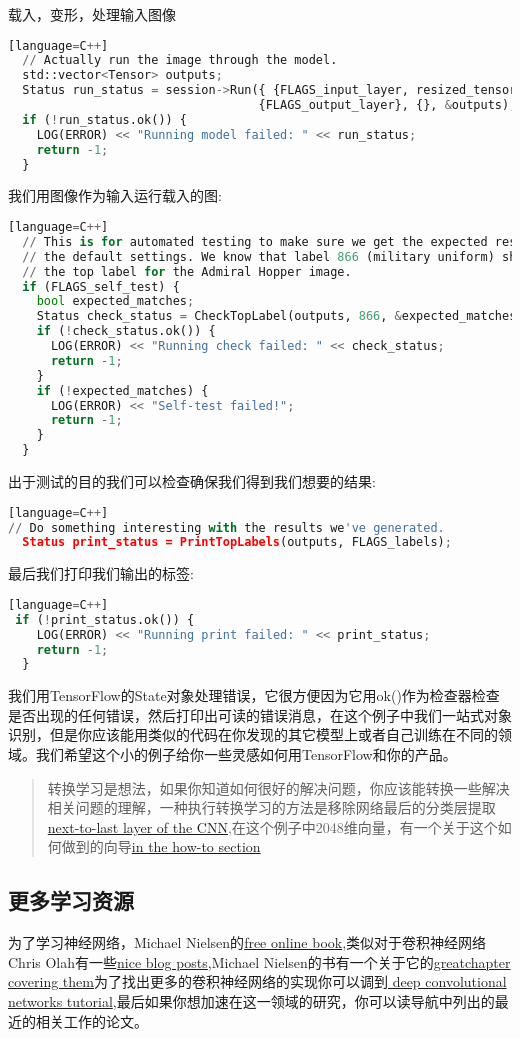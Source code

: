 载入，变形，处理输入图像
\begin{lstlisting}[language=Python][language=C++]
  // Actually run the image through the model.
  std::vector<Tensor> outputs;
  Status run_status = session->Run({ {FLAGS_input_layer, resized_tensor}},
                                   {FLAGS_output_layer}, {}, &outputs);
  if (!run_status.ok()) {
    LOG(ERROR) << "Running model failed: " << run_status;
    return -1;
  }
\end{lstlisting}
我们用图像作为输入运行载入的图:
\begin{lstlisting}[language=Python][language=C++]
  // This is for automated testing to make sure we get the expected result with
  // the default settings. We know that label 866 (military uniform) should be
  // the top label for the Admiral Hopper image.
  if (FLAGS_self_test) {
    bool expected_matches;
    Status check_status = CheckTopLabel(outputs, 866, &expected_matches);
    if (!check_status.ok()) {
      LOG(ERROR) << "Running check failed: " << check_status;
      return -1;
    }
    if (!expected_matches) {
      LOG(ERROR) << "Self-test failed!";
      return -1;
    }
  }
\end{lstlisting}
出于测试的目的我们可以检查确保我们得到我们想要的结果:
\begin{lstlisting}[language=Python][language=C++]
// Do something interesting with the results we've generated.
  Status print_status = PrintTopLabels(outputs, FLAGS_labels);
\end{lstlisting}
最后我们打印我们输出的标签:
\begin{lstlisting}[language=Python][language=C++]
 if (!print_status.ok()) {
    LOG(ERROR) << "Running print failed: " << print_status;
    return -1;
  }
\end{lstlisting}
我们用TensorFlow的State对象处理错误，它很方便因为它用ok()作为检查器检查是否出现的任何错误，然后打印出可读的错误消息，在这个例子中我们一站式对象识别，但是你应该能用类似的代码在你发现的其它模型上或者自己训练在不同的领域。我们希望这个小的例子给你一些灵感如何用TensorFlow和你的产品。
\begin{quote}
转换学习是想法，如果你知道如何很好的解决问题，你应该能转换一些解决相关问题的理解，一种执行转换学习的方法是移除网络最后的分类层提取\href{http://arxiv.org/abs/1310.1531}{next-to-last layer of the CNN},在这个例子中2048维向量，有一个关于这个如何做到的向导\href{https://www.tensorflow.org/tutorials/image_retraining}{in the how-to section}
\end{quote}
\subsection{更多学习资源}
为了学习神经网络，Michael Nielsen的\href{http://neuralnetworksanddeeplearning.com/chap1.html}{free online book},类似对于卷积神经网络Chris Olah有一些\href{http://colah.github.io/posts/2014-07-Conv-Nets-Modular/}{nice blog posts},Michael Nielsen的书有一个关于它的\href{http://neuralnetworksanddeeplearning.com/chap6.html}{greatchapter covering them}为了找出更多的卷积神经网络的实现你可以调到\href{https://www.tensorflow.org/tutorials/deep_cnn}{ deep convolutional networks tutorial},最后如果你想加速在这一领域的研究，你可以读导航中列出的最近的相关工作的论文。
